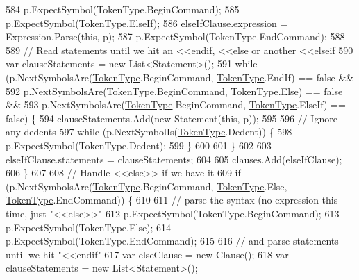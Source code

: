 \begin{DoxyCode}
584                     p.ExpectSymbol(TokenType.BeginCommand);
585                     p.ExpectSymbol(TokenType.ElseIf);
586                     elseIfClause.expression = Expression.Parse(\textcolor{keyword}{this}, p);
587                     p.ExpectSymbol(TokenType.EndCommand);
588 
589                     \textcolor{comment}{// Read statements until we hit an <<endif, <<else or another <<elseif}
590                     var clauseStatements = \textcolor{keyword}{new} List<Statement>();
591                     \textcolor{keywordflow}{while} (p.NextSymbolsAre(\hyperlink{a00040_a301aa7c866593a5b625a8fc158bbeace}{TokenType}.BeginCommand, 
      \hyperlink{a00040_a301aa7c866593a5b625a8fc158bbeace}{TokenType}.EndIf) == \textcolor{keyword}{false} &&
592                         p.NextSymbolsAre(TokenType.BeginCommand, TokenType.Else) == \textcolor{keyword}{false} &&
593                         p.NextSymbolsAre(\hyperlink{a00040_a301aa7c866593a5b625a8fc158bbeace}{TokenType}.BeginCommand, 
      \hyperlink{a00040_a301aa7c866593a5b625a8fc158bbeace}{TokenType}.ElseIf) == \textcolor{keyword}{false}) \{
594                         clauseStatements.Add(\textcolor{keyword}{new} Statement(\textcolor{keyword}{this}, p));
595 
596                         \textcolor{comment}{// Ignore any dedents}
597                         \textcolor{keywordflow}{while} (p.NextSymbolIs(\hyperlink{a00040_a301aa7c866593a5b625a8fc158bbeace}{TokenType}.Dedent)) \{
598                             p.ExpectSymbol(TokenType.Dedent);
599                         \}
600 
601                     \}
602 
603                     elseIfClause.statements = clauseStatements;
604 
605                     clauses.Add(elseIfClause);
606                 \}
607 
608                 \textcolor{comment}{// Handle <<else>> if we have it}
609                 \textcolor{keywordflow}{if} (p.NextSymbolsAre(\hyperlink{a00040_a301aa7c866593a5b625a8fc158bbeace}{TokenType}.BeginCommand, \hyperlink{a00040_a301aa7c866593a5b625a8fc158bbeace}{TokenType}.Else, 
      \hyperlink{a00040_a301aa7c866593a5b625a8fc158bbeace}{TokenType}.EndCommand)) \{
610 
611                     \textcolor{comment}{// parse the syntax (no expression this time, just "<<else>>"}
612                     p.ExpectSymbol(TokenType.BeginCommand);
613                     p.ExpectSymbol(TokenType.Else);
614                     p.ExpectSymbol(TokenType.EndCommand);
615 
616                     \textcolor{comment}{// and parse statements until we hit "<<endif"}
617                     var elseClause = \textcolor{keyword}{new} Clause();
618                     var clauseStatements = \textcolor{keyword}{new} List<Statement>();

\end{DoxyCode}
